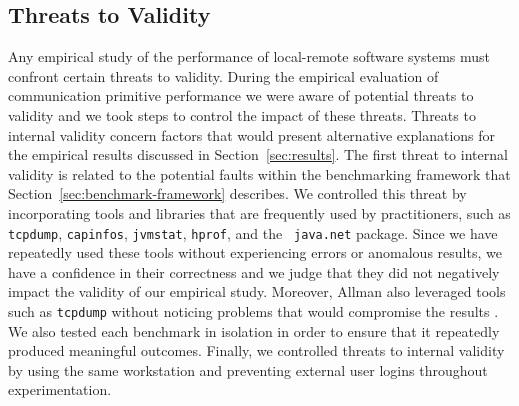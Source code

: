 \documentclass{sig-alternate}
\begin{document}




\subsection{Threats to Validity}
\label{sec:threats-validity}


Any empirical study of the performance of local-remote software
systems must confront certain threats to validity.  During the
empirical evaluation of communication primitive performance we were
aware of potential threats to validity and we took steps to control
the impact of these threats.  Threats to internal validity concern
factors that would present alternative explanations for the empirical
results discussed in Section~\ref{sec:results}.  The first threat to
internal validity is related to the potential faults within the
benchmarking framework that Section~\ref{sec:benchmark-framework}
describes.  We controlled this threat by incorporating tools and
libraries that are frequently used by practitioners, such as {\tt
  tcpdump}, {\tt capinfos}, {\tt jvmstat}, {\tt hprof}, and the {\tt
  java.net} package.  Since we have repeatedly used these tools
without experiencing errors or anomalous results, we have a confidence
in their correctness and we judge that they did not negatively impact
the validity of our empirical study.  Moreover, Allman also leveraged
tools such as {\tt tcpdump} without noticing problems that would
compromise the results \cite{allman-per}.  We also tested each
benchmark in isolation in order to ensure that it repeatedly produced
meaningful outcomes.  Finally, we controlled threats to internal
validity by using the same workstation and preventing external user
logins throughout experimentation.
\end{document}
